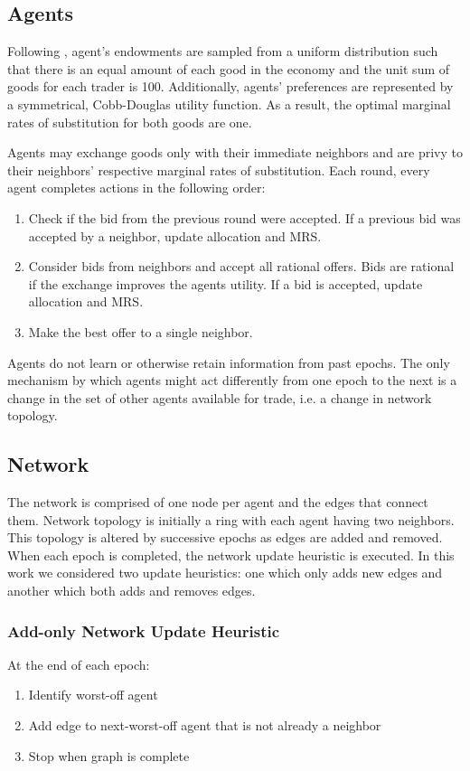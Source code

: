 \documentclass[smallextended]{svjour3}
\begin{document}
\subsection{Agents}
Following \cite{albin1992decentralized}, agent's endowments are sampled from a uniform distribution such that there is an equal amount of each good in the economy and the unit sum of goods for each trader is 100.
Additionally, agents' preferences are represented by a symmetrical, Cobb-Douglas utility function.
As a result, the optimal marginal rates of substitution for both goods are one.

Agents may exchange goods only with their immediate neighbors and are privy to their
neighbors' respective marginal rates of substitution. Each round, every agent
completes actions in the following order:
\begin{enumerate}
\item Check if the bid from the previous round were accepted.
If a previous bid was accepted by a neighbor, update allocation and MRS.
\item Consider bids from neighbors and accept all rational offers.
Bids are rational if the exchange improves the agents utility. If a bid is
accepted, update allocation and MRS.
\item Make the best offer to a single neighbor.
\end{enumerate}

Agents do not learn or otherwise retain information from past epochs.
The only mechanism by which agents might act differently from one epoch to the next is
a change in the set of other agents available for trade, i.e. a change in
network topology.

\subsection{Network}
The network is comprised of one node per agent and the edges that connect them.
Network topology is initially a ring with each agent having two neighbors.
This topology is altered by successive epochs as edges are added and removed.
When each epoch is completed, the network update heuristic is executed. In this work
we considered two update heuristics: one which only adds new edges and another
which both adds and removes edges.

\subsubsection{Add-only Network Update Heuristic}
  At the end of each epoch:
  \begin{enumerate}
  \item Identify worst-off agent
  \item Add edge to next-worst-off agent that is not already a neighbor
  \item Stop when graph is complete
  \end{enumerate}
\end{document}
